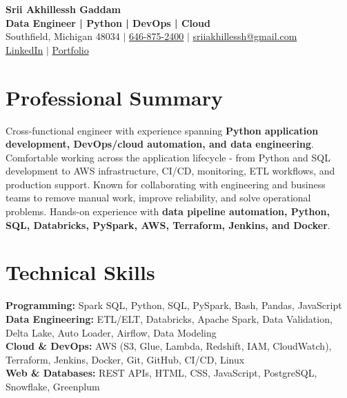 \documentclass[letterpaper,10pt]{article}
\begin{document}
\fontsize{9.35pt}{10.45pt}\selectfont

\begin{center}
    {\LARGE \textbf{Srii Akhillessh Gaddam}} \\[-1pt]
    \textbf{Data Engineer | Python | DevOps | Cloud} \\[2pt]
    Southfield, Michigan 48034 $|$
    \href{tel:6468752400}{646-875-2400} $|$
    \href{mailto:sriiakhillessh@gmail.com}{sriiakhillessh@gmail.com} \\[1pt]
    \href{https://www.linkedin.com/in/srii-akhiilessh-gaddam-b48668191/}{LinkedIn} $|$
    \href{https://sriiakhillesshg.github.io/portfolio/}{Portfolio}
\end{center}
\vspace{-8pt}

\section{Professional Summary}
\small{Cross-functional engineer with experience spanning \textbf{Python application development, DevOps/cloud automation, and data engineering}. Comfortable working across the application lifecycle - from Python and SQL development to AWS infrastructure, CI/CD, monitoring, ETL workflows, and production support. Known for collaborating with engineering and business teams to remove manual work, improve reliability, and solve operational problems. Hands-on experience with \textbf{data pipeline automation, Python, SQL, Databricks, PySpark, AWS, Terraform, Jenkins, and Docker}.}

\section{Technical Skills}
\small{
\textbf{Programming:} Spark SQL, Python, SQL, PySpark, Bash, Pandas, JavaScript \\
\textbf{Data Engineering:} ETL/ELT, Databricks, Apache Spark, Data Validation, Delta Lake, Auto Loader, Airflow, Data Modeling \\
\textbf{Cloud \& DevOps:} AWS (S3, Glue, Lambda, Redshift, IAM, CloudWatch), Terraform, Jenkins, Docker, Git, GitHub, CI/CD, Linux \\
\textbf{Web \& Databases:} REST APIs, HTML, CSS, JavaScript, PostgreSQL, Snowflake, Greenplum
}

\end{document}
